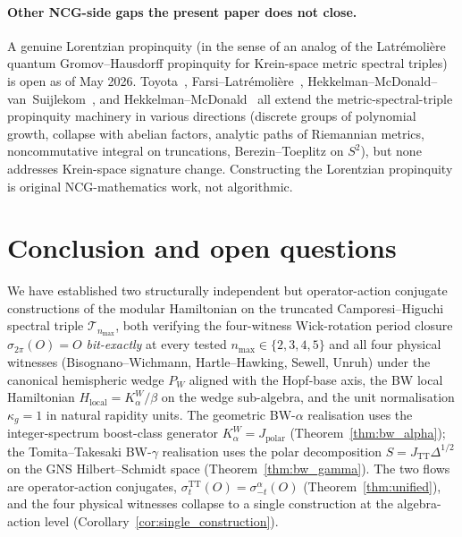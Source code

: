 \documentclass[11pt,a4paper]{article}
\theoremstyle{plain}
\theoremstyle{definition}
\newcommand{\nmax}{n_{\max}}
\newcommand{\Tcal}{\mathcal{T}}
\newcommand{\TT}{\mathrm{TT}}
\begin{document}
\paragraph{Other NCG-side gaps the present paper does not close.}
A genuine Lorentzian propinquity (in the sense of an analog of the
Latr\'emoli\`ere quantum Gromov--Hausdorff propinquity for
Krein-space metric spectral triples) is open as of May 2026.
Toyota~\cite{toyota2023}, Farsi--Latr\'emoli\`ere~\cite{farsi_latremoliere2024,
farsi_latremoliere2025}, Hekkelman--McDonald--van~Suijlekom~\cite{ucp_maps_2024},
and Hekkelman--McDonald~\cite{hekkelman_mcdonald2024b} all extend
the metric-spectral-triple propinquity machinery in various directions
(discrete groups of polynomial growth, collapse with abelian factors,
analytic paths of Riemannian metrics, noncommutative integral on
truncations, Berezin--Toeplitz on $S^2$), but none addresses
Krein-space signature change. Constructing the Lorentzian propinquity
is original NCG-mathematics work, not algorithmic.

\section{Conclusion and open questions}\label{sec:conclusion}

We have established two structurally independent but operator-action
conjugate constructions of the modular Hamiltonian on the truncated
Camporesi--Higuchi spectral triple $\Tcal_{\nmax}$, both verifying
the four-witness Wick-rotation period closure
$\sigma_{2\pi}(O) = O$ \emph{bit-exactly} at every tested
$\nmax \in \{2, 3, 4, 5\}$ and all four physical witnesses
(Bisognano--Wichmann, Hartle--Hawking, Sewell, Unruh) under the
canonical hemispheric wedge $P_W$ aligned with the Hopf-base axis,
the BW local Hamiltonian $H_{\mathrm{local}} = K_\alpha^W / \beta$
on the wedge sub-algebra, and the unit normalisation $\kappa_g = 1$
in natural rapidity units. The geometric BW-$\alpha$ realisation
uses the integer-spectrum boost-class generator $K_\alpha^W =
J_{\mathrm{polar}}$ (Theorem~\ref{thm:bw_alpha}); the
Tomita--Takesaki BW-$\gamma$ realisation uses the polar
decomposition $S = J_{\TT} \Delta^{1/2}$ on the GNS Hilbert--Schmidt
space (Theorem~\ref{thm:bw_gamma}). The two flows are operator-action
conjugates, $\sigma_t^{\TT}(O) = \sigma_{-t}^{\alpha}(O)$
(Theorem~\ref{thm:unified}), and the four physical witnesses collapse
to a single construction at the algebra-action level
(Corollary~\ref{cor:single_construction}).
\end{document}
